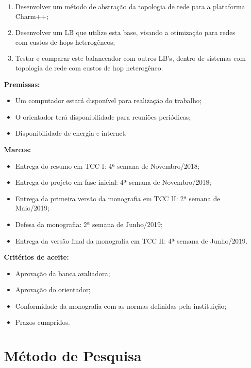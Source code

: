 \documentclass[
	12pt,				%
	openright,			%
	twoside,			%
	a4paper,			%
	english,			%
	brazil,				%
	]{abntex2}
\begin{document}
\begin{enumerate}
\item Desenvolver um método de abstração da topologia de rede para a plataforma Charm++;
\item  Desenvolver um LB que utilize esta base, visando a otimização para redes com custos de hops heterogêneos;
\item Testar e comparar este balanceador com outros LB's, dentro de sistemas com topologia de rede com custos de hop heterogêneo.
\end{enumerate}

\begin{flushleft}
\textbf{Premissas:}
\begin{itemize}
\item Um computador estará disponível para realização do trabalho; 
\item O orientador terá disponibilidade para reuniões periódicas;
\item Disponibilidade de energia e internet.
\end{itemize}

\textbf{Marcos:}
\begin{itemize}
 
\item Entrega do resumo em TCC I: 4ª semana de Novembro/2018; 
\item Entrega do projeto em fase inicial: 4ª semana de Novembro/2018;
\item Entrega da primeira versão da monografia em TCC II: 2ª semana de Maio/2019; 
\item Defesa da monografia: 2ª semana de Junho/2019;
\item Entrega da versão final da monografia em TCC II: 4ª semana de Junho/2019.
\end{itemize}

\textbf{Critérios de aceite:}
\begin{itemize}
\item Aprovação da banca avaliadora;
\item Aprovação do orientador;
\item Conformidade da monografia com as normas definidas pela instituição;
\item Prazos cumpridos.
\end{itemize}
\end{flushleft}

\section{Método de Pesquisa}
\label{sec:metodologia}
\end{document}
